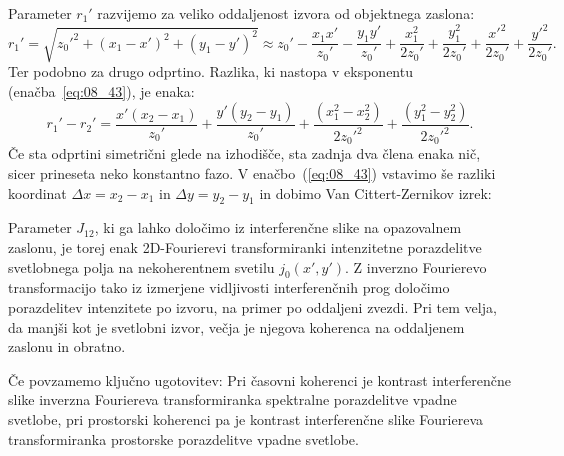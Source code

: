 Parameter $r_1'$ razvijemo za veliko oddaljenost izvora od objektnega zaslona:
\begin{equation}
r_1' = \sqrt{z_0'^2+(x_1-x')^2+ (y_1-y')^2} \approx
z_0'-\frac{x_1x'}{z_0'}-\frac{y_1y'}{z_0'}+\frac{x_1^2}{2z_0'}+\frac{y_1^2}{2z_0'}+\frac{x'^2}{2z_0'}
+\frac{y'^2}{2z_0'}.
\label{eq:08_44}
\end{equation}
Ter podobno za drugo odprtino. 
Razlika, ki nastopa v eksponentu (enačba~\ref{eq:08_43}), je enaka:
\begin{equation}
r_1'-r_2' = \frac{x'(x_2-x_1)}{z_0'}+\frac{y'(y_2-y_1)}{z_0'}
+ \frac{(x_1^2-x_2^2)}{2z_0'^2} + \frac{(y_1^2-y_2^2)}{2z_0'^2}.
\label{eq:08_46}
\end{equation}
Če sta odprtini simetrični glede na izhodišče, sta zadnja dva člena
enaka nič, sicer prineseta neko konstantno fazo. V enačbo~(\ref{eq:08_43}) vstavimo 
še razliki koordinat
$\Delta x = x_2-x_1$ in $\Delta y = y_2-y_1$ in dobimo Van Cittert-Zernikov izrek:

Parameter $J_{12}$, ki ga lahko določimo iz interferenčne slike na opazovalnem zaslonu,
je torej enak 2D-Fourierevi transformiranki intenzitetne porazdelitve svetlobnega polja 
na nekoherentnem svetilu $j_0(x',y')$. Z inverzno Fourierevo transformacijo tako iz izmerjene vidljivosti
interferenčnih prog določimo porazdelitev intenzitete po izvoru, na primer po oddaljeni zvezdi. 
Pri tem velja, da manjši kot je svetlobni izvor, večja je njegova koherenca na oddaljenem 
zaslonu in obratno.

Če povzamemo ključno ugotovitev: Pri časovni koherenci je kontrast interferenčne slike
inverzna Fouriereva transformiranka spektralne porazdelitve vpadne svetlobe, pri prostorski
koherenci pa je kontrast interferenčne slike Fouriereva transformiranka prostorske porazdelitve vpadne svetlobe.


